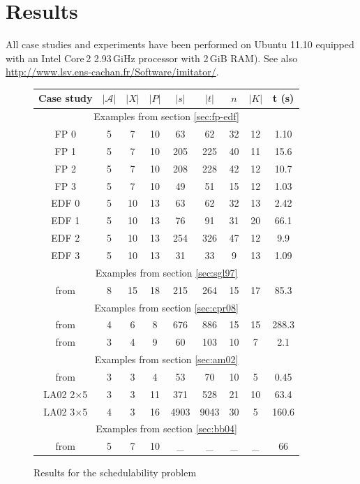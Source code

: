 \documentclass{article}
\begin{document}
\section{Results}
All case studies and experiments have been performed on Ubuntu 11.10 equipped with an Intel Core\,2 2.93\,GiHz processor with 2\,GiB RAM).
 See also \url{http://www.lsv.ens-cachan.fr/Software/imitator/}.
\begin{figure}[!ht]
\begin{tabular}{|c|c|c|c|c|c|c|c|c|}
\hline
 Case study 		& $|\mathcal{A}|$& $|X|$ & $|P|$ & $|s|$ 	& $|t|$ 	& $n$ 	& $|K|$ & t (s) 	      	\\
\hline
\multicolumn{9}{||c||}{Examples from section \ref{sec:fp-edf}}\\
\hline
FP 0	& 5 & 7 	& 10 	& 63 	& 62 	& 32 & 12 & 1.10  	\\
\hline
FP 1		& 5 & 7 	& 10 	& 205 	& 225	& 40	& 11 & 15.6  \\
\hline
FP 2		& 5 & 7 	& 10 	& 208  	& 228	& 42	& 12 & 10.7  \\
\hline
FP 3		& 5 & 7 	& 10 	& 49	& 51		& 15	& 12 & 1.03  \\
\hline
EDF 0 	& 5 & 10 	& 13 	& 63 	& 62 	& 32 & 13 & 2.42  	\\
\hline
EDF 1		& 5 & 10 	& 13 	& 76 	& 91 & 31	& 20 & 66.1  \\
\hline
EDF 2		& 5 & 10 	& 13 	& 254  	& 326	& 47	& 12 & 9.9  \\
\hline
EDF 3		& 5 & 10&  13   & 31 	& 33		& 9	& 13 & 1.09  \\
\hline
\multicolumn{9}{||c||}{Examples from section \ref{sec:sgl97}}\\
\hline
from \cite{sgl97}		 &8& 	15& 	18& 	215& 	264& 	15& 	17& 	85.3\\
\hline
\multicolumn{9}{||c||}{Examples from section \ref{sec:cpr08}}\\
\hline
from \cite{cpr08} &4 &	6 &	8 &	676& 	886& 	15& 	15& 	288.3\\
\hline
from \cite{lpprc10} &3 &	4 &	9 &	60& 	103& 	10& 	7& 	2.1\\
\hline
\multicolumn{9}{||c||}{Examples from section \ref{sec:am02}}\\
\hline
from \cite{am02} 	&3&	3& 	4& 	53& 	70& 	10& 	5& 	0.45\\
\hline 
LA02 2$\times$5	&3&	3&	11&	371&	528&	21&	10&	63.4\\
\hline
LA02 3$\times$5&	4&	3&	16&	4903&	9043&	30&	5	&160.6\\
\hline
\multicolumn{9}{||c||}{Examples from section \ref{sec:bb04}}\\
\hline
from \cite{bb04}	&5&	7&	10&	\_&	\_&	\_&	\_&	66\\
\hline

\end{tabular}
\caption{Results for the schedulability problem}
\end{figure}
\end{document}
